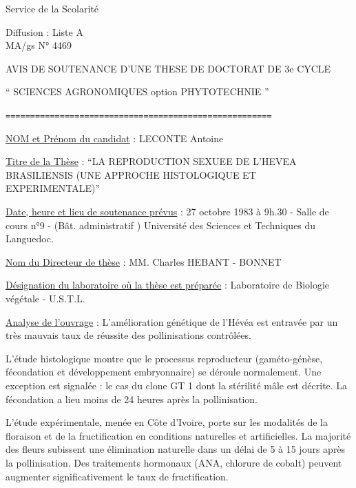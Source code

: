 \medskip
Service de la Scolarité

Diffusion : Liste A\\
MA/gs \qquad N° 4469

\begin{center}
AVIS DE SOUTENANCE D'UNE THESE DE DOCTORAT DE 3e CYCLE

`` SCIENCES AGRONOMIQUES option PHYTOTECHNIE ''

\texttt{======================================================}
\end{center}

\uline{NOM et Prénom du candidat} : LECONTE Antoine

\uline{Titre de la Thèse} : ``LA REPRODUCTION SEXUEE DE L'HEVEA BRASILIENSIS
(UNE APPROCHE HISTOLOGIQUE ET EXPERIMENTALE)''

\uline{Date, heure et lieu de soutenance prévus} : 27 octobre 1983 à 9h.30 - Salle
de cours n°9 - (Bât. administratif ) Université des Sciences et Techniques du
Languedoc.

\uline{Nom du Directeur de thèse} : MM. Charles HEBANT - BONNET

\uline{Désignation du laboratoire où la thèse est préparée} : Laboratoire de
Biologie végétale - U.S.T.L.

\noindent\hspace*{.77\linewidth}%

\uline{Analyse de l'ouvrage} : L'amélioration génétique de l'Hévéa est entravée par un
très mauvais taux de réussite des pollinisations contrôlées.

L'étude histologique montre que le processus reproducteur
(gaméto-génèse, fécondation et développement embryonnaire) se déroule normalement.
Une exception est signalée : le cas du clone GT 1 dont la stérilité mâle est
décrite. La fécondation a lieu moins de 24 heures après la pollinisation.

L'étude expérimentale, menée en Côte d'Ivoire, porte sur
les modalités de la floraison et de la fructification en conditions naturelles
et artificielles. La majorité des fleurs subissent une élimination naturelle
dans un délai de 5 à 15 jours après la pollinisation. Des traitements hormonaux
(ANA, chlorure de cobalt) peuvent augmenter significativement le taux de
fructification.


